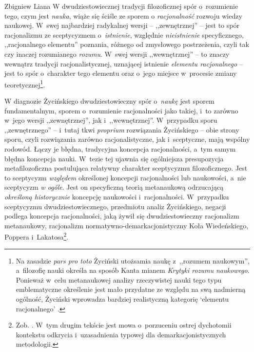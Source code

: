 \begin{artplenv}{Zbigniew Liana}
W dwudziestowiecznej tradycji filozoficznej spór o~rozumienie tego, czym jest \textit{nauka}, wiąże się ściśle ze
sporem o \textit{racjonalność} rozwoju wiedzy naukowej. W~swej najbardziej radykalnej wersji -- ,,zewnętrznej'' --
jest to spór racjonalizmu ze sceptycyzmem o~\textit{istnienie}, względnie \textit{nieistnienie} specyficznego, ,,racjonalnego
elementu'' poznania, różnego od zmysłowego postrzeżenia, czyli tak czy inaczej rozumianego \textit{rozumu}. W~swej wersji
,,wewnętrznej'' -- to znaczy wewnątrz tradycji racjonalistycznej, uznającej istnienie \textit{elementu racjonalnego} -- jest
to spór o~charakter tego elementu oraz o~jego miejsce w~procesie zmiany teoretycznej\footnote{Na zasadzie \textit{pars
pro toto} Życiński
\parencite*[s.~184]{zycinski_jezyk_1983}
utożsamia naukę z~,,rozumem naukowym'', a~filozofię nauki
określa na sposób Kanta mianem \textit{Krytyki rozumu naukowego}. Ponieważ w~celu metanaukowej analizy rzeczywistej nauki
tego typu emblematyczne określenie jest mało przydatne ze względu na swą nadmierną ogólność, Życiński wprowadza
bardziej realistyczną kategorię `elementu racjonalnego'
\parencite[s.~142n]{zycinski_jezyk_1983}.
}.

W diagnozie Życińskiego dwudziestowieczny spór o~\textit{naukę} jest sporem fundamentalnym, sporem o~rozumienie
racjonalności jako takiej, i~to zarówno w~jego wersji ,,zewnętrznej'', jak i~,,wewnętrznej''. W~przypadku sporu
,,zewnętrznego'' -- i~tutaj tkwi \textit{proprium} rozwiązania Życińskiego -- obie strony sporu, czyli rozwiązania zarówno
racjonalistyczne, jak i~sceptyczne, mają wspólny rodowód. Łączy je błędna, tradycyjna koncepcja racjonalności, a~tym
samym błędna koncepcja nauki. W~tezie tej ujawnia się ogólniejsza presupozycja metafilozoficzna postulująca relatywny
charakter sceptycyzmu filozoficznego. Jest to sceptycyzm \textit{względem} określonej koncepcji racjonalności lub
naukowości, a~nie sceptycyzm \textit{w ogóle}. Jest on specyficzną teorią metanaukową odrzucającą \textit{określoną
historycznie} koncepcję naukowości i~racjonalności. W~przypadku sceptycyzmu dwudziestowiecznego, przedmiotu analiz
Życińskiego, negacji podlega koncepcja racjonalności, jaką żywił się dwudziestowieczny racjonalizm metanaukowy,
racjonalizm normatywno-demarkacjonistyczny Koła Wiedeńskiego, Poppera i~Lakatosa\footnote{Zob.
\parencites[s.~228]{zycinski_elementy_1996}[s.~186]{zycinski_jezyk_1983}.
W~tym drugim tekście jest mowa o~porzuceniu ostrej
dychotomii kontekstu odkrycia i~uzasadnienia typowej dla demarkacjonistycznych metodologii.}.


\end{artplenv}
